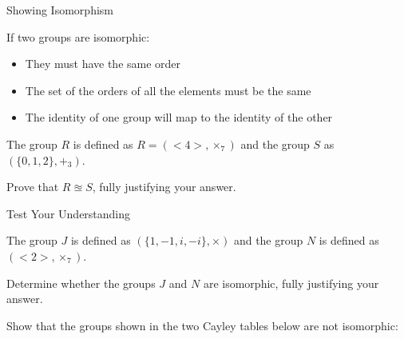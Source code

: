 \documentclass[8pt]{beamer}
\begin{document}
\begin{frame}{Showing Isomorphism}
	\begin{definition}
		If two groups are isomorphic:
		\begin{itemize}
			\item They must have the same order
			\item The set of the orders of all the elements must be the same
			\item The identity of one group will map to the identity of the other
		\end{itemize}
	\end{definition}
		\begin{Problem}
			The group $R$ is defined as  $R=(<4>,\times_7)$ and the group  $S$ as  $(\{0,1,2\},+_3)$.

			Prove that  $R \approxeq S$, fully justifying your answer.

		\end{Problem}

\end{frame}


\begin{frame}{Test Your Understanding}
	\begin{Problem}
		The group $J$ is defined as  $(\{1,-1,i,-i\},\times)$ and the group  $N$ is defined as  $(<2>,\times_7)$.

		Determine whether the groups  $J$ and  $N$ are isomorphic, fully justifying your answer.
	\end{Problem}

	\begin{Problem}
		Show that the groups shown in the two Cayley tables below are not isomorphic:
		
	\end{Problem}

\end{frame}
\end{document}
